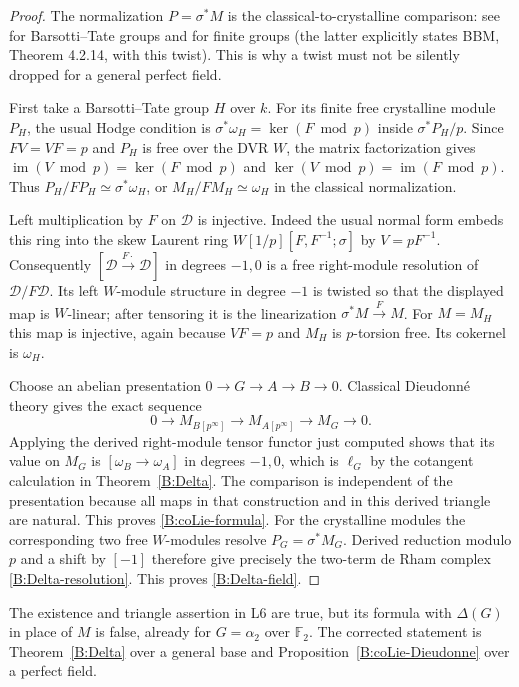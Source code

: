 \begin{proof}
The normalization $P=\sigma^*M$ is the classical-to-crystalline
comparison: see \cite[Proposition 4.51]{B:ALB} for Barsotti--Tate
groups and \cite[Theorem 3.8]{B:MondalClassifying} for finite groups
(the latter explicitly states BBM, Theorem 4.2.14, with this twist).
This is why a twist must not be silently dropped for a general
perfect field.

First take a Barsotti--Tate group $H$ over $k$.
For its finite free crystalline module $P_H$, the usual Hodge
condition is $\sigma^*\omega_H=\ker(F\bmod p)$ inside
$\sigma^*P_H/p$. Since $FV=VF=p$ and $P_H$ is free over the DVR
$W$, the matrix factorization gives
$\operatorname{im}(V\bmod p)=\ker(F\bmod p)$ and
$\ker(V\bmod p)=\operatorname{im}(F\bmod p)$.
Thus $P_H/FP_H\simeq\sigma^*\omega_H$, or
$M_H/FM_H\simeq\omega_H$ in the classical normalization.

Left multiplication by $F$ on $\mathcal D$ is injective. Indeed
the usual normal form embeds this ring into the skew Laurent ring
$W[1/p][F,F^{-1};\sigma]$ by $V=pF^{-1}$.
Consequently
$[\mathcal D\xrightarrow{F\cdot}\mathcal D]$ in degrees $-1,0$
is a free right-module resolution of $\mathcal D/F\mathcal D$.
Its left $W$-module structure in degree $-1$ is twisted so that
the displayed map is $W$-linear; after tensoring it is the
linearization $\sigma^*M\xrightarrow{F}M$.
For $M=M_H$ this map is injective, again because $VF=p$ and
$M_H$ is $p$-torsion free. Its cokernel is $\omega_H$.

Choose an abelian presentation $0\to G\to A\to B\to0$.
Classical Dieudonn\'e theory gives the exact sequence
\[
 0\to M_{B[p^\infty]}\to M_{A[p^\infty]}\to M_G\to0.
\]
Applying the derived right-module tensor functor just computed
shows that its value on $M_G$ is
$[\omega_B\to\omega_A]$ in degrees $-1,0$, which is $\ell_G$
by the cotangent calculation in Theorem~\ref{B:Delta}.
The comparison is independent of the presentation because all
maps in that construction and in this derived triangle are natural.
This proves \eqref{B:coLie-formula}.
For the crystalline modules the corresponding two free $W$-modules
resolve $P_G=\sigma^*M_G$. Derived reduction modulo $p$ and a shift
by $[-1]$ therefore give precisely the two-term de Rham complex
\eqref{B:Delta-resolution}. This proves \eqref{B:Delta-field}.
\end{proof}

\begin{proposition}
\label{B:L6-refutation}
The existence and triangle assertion in L6 are true, but its formula
with $\Delta(G)$ in place of $M$ is false, already for
$G=\alpha_2$ over $\mathbb F_2$. The corrected statement is
Theorem~\ref{B:Delta} over a general base and
Proposition~\ref{B:coLie-Dieudonne} over a perfect field.
\end{proposition}

